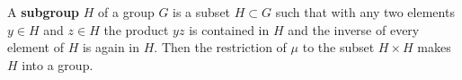 A \textbf{subgroup} $H$ of a group $G$ is a subset $H \subset G$ such that with any two elements $y \in H$ and $z \in H$ the product $yz$ is contained in $H$ and the inverse of every element of $H$ is again in $H$. Then the restriction of $\mu$ to the subset $H \times H$ makes $H$ into a group.
